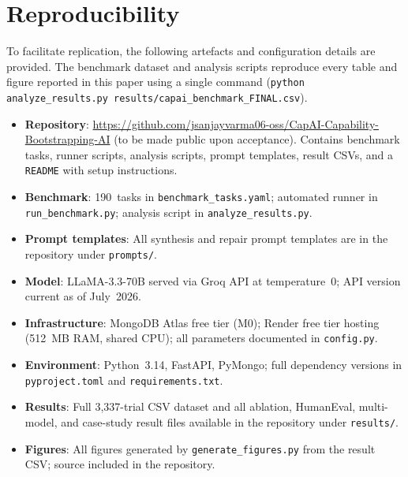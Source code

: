\documentclass[conference]{IEEEtran}
\begin{document}
\section{Reproducibility}
\label{sec:reproducibility}

To facilitate replication, the following artefacts and configuration
details are provided.
The benchmark dataset and analysis scripts reproduce every table and
figure reported in this paper using a single command
(\texttt{python analyze\_results.py results/capai\_benchmark\_FINAL.csv}).

\begin{itemize}
  \item \textbf{Repository}: \url{https://github.com/jsanjayvarma06-oss/CapAI-Capability-Bootstrapping-AI}
        (to be made public upon acceptance). Contains benchmark tasks,
        runner scripts, analysis scripts, prompt templates, result CSVs,
        and a \texttt{README} with setup instructions.
  \item \textbf{Benchmark}: 190~tasks in \texttt{benchmark\_tasks.yaml};
        automated runner in \texttt{run\_benchmark.py}; analysis script
        in \texttt{analyze\_results.py}.
  \item \textbf{Prompt templates}: All synthesis and repair prompt
        templates are in the repository under \texttt{prompts/}.
  \item \textbf{Model}: LLaMA-3.3-70B served via Groq API at
        temperature~0; API version current as of July~2026.
  \item \textbf{Infrastructure}: MongoDB Atlas free tier (M0); Render free
        tier hosting (512~MB RAM, shared CPU); all parameters documented
        in \texttt{config.py}.
  \item \textbf{Environment}: Python~3.14, FastAPI, PyMongo; full
        dependency versions in \texttt{pyproject.toml} and
        \texttt{requirements.txt}.
  \item \textbf{Results}: Full 3{,}337-trial CSV dataset and all ablation,
        HumanEval, multi-model, and case-study result files available
        in the repository under \texttt{results/}.
  \item \textbf{Figures}: All figures generated by \texttt{generate\_figures.py}
        from the result CSV; source included in the repository.
\end{itemize}
\end{document}
